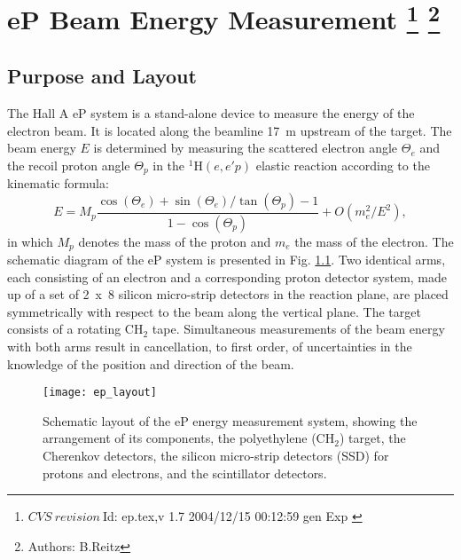 \chapter[eP Beam Energy Measurement]{eP Beam Energy Measurement
\label{sec:ep}
\footnote{
  $CVS~revision~ $Id: ep.tex,v 1.7 2004/12/15 00:12:59 gen Exp $ $
}
\footnote{Authors: B.Reitz }
}
\section {Purpose and Layout}
\label{sec:ep_purpose}

The Hall A eP system is a stand-alone device to measure the 
energy of the electron beam. It is located along the beamline
17~m upstream of the target. The beam energy $E$ is determined by measuring
the scattered electron angle $\Theta_e$ and the recoil proton angle
$\Theta_p$ in the $^1$H$(e,e'p)$ elastic reaction according to the kinematic
formula:
\begin{equation}
E = M_p \frac{\cos(\Theta_e) + \sin(\Theta_e)/\tan(\Theta_p) - 1}{1 - \cos(\Theta_p)} + O(m_e^2/E^2),
\end{equation}
in which $M_p$ denotes the mass of the proton and $m_e$ the mass of the electron.
The schematic diagram of the eP system is presented in Fig. \ref{fig:ep_layout}. 
Two identical arms, each consisting of an electron and a corresponding proton 
detector system, made up of a set of 2~x~8 silicon micro-strip detectors in the
reaction plane, are placed symmetrically with respect to the beam along the 
vertical plane. The target consists of a rotating CH$_2$ tape.
Simultaneous measurements of the beam energy with both arms result
in cancellation, to first order, of uncertainties in the knowledge of the position
and direction of the beam. 
 \begin{figure}[htb]
    \begin{center}
        \texttt{[image: ep\_layout]}
    \end{center}
    \caption[eP: Layout]{
            Schematic layout of the eP energy measurement system,
            showing the arrangement of its components, the polyethylene (CH$_2$) 
            target, the Cherenkov detectors, the silicon micro-strip detectors (SSD) 
            for protons and electrons, and the scintillator detectors.
            }
    \label{fig:ep_layout} 
 \end{figure}  

